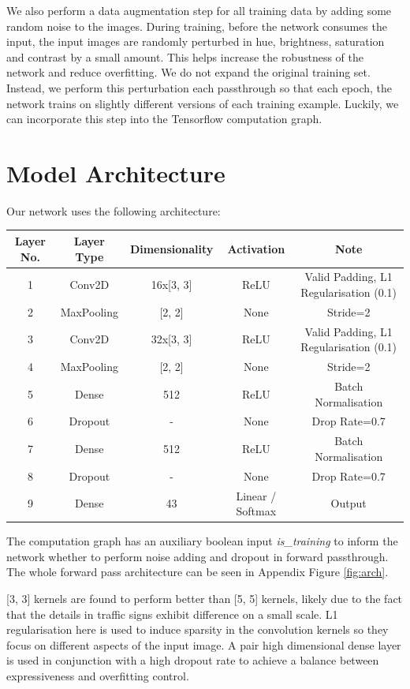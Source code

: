 \documentclass[]{article}
\begin{document}
We also perform a data augmentation step for all training data by adding some random noise to the images. During training, before the network consumes the input, the input images are randomly perturbed in hue, brightness, saturation and contrast by a small amount. This helps increase the robustness of the network and reduce overfitting. We do not expand the original training set. Instead, we perform this perturbation each passthrough so that each epoch, the network trains on slightly different versions of each training example. Luckily, we can incorporate this step into the Tensorflow computation graph.

\newpage
\section{Model Architecture}

Our network uses the following architecture:

\begin{center}
	\begin{tabular}{c | c | c | c | c}
		\hline
		Layer No. & Layer Type & Dimensionality & Activation & Note \\ \hline
		1 & Conv2D & 16x[3, 3] & ReLU & Valid Padding, L1 Regularisation (0.1) \\ \hline
		2 & MaxPooling & [2, 2] & None & Stride=2 \\ \hline
		3 & Conv2D & 32x[3, 3] & ReLU & Valid Padding, L1 Regularisation (0.1) \\ \hline
		4 & MaxPooling & [2, 2] & None & Stride=2 \\ \hline
		5 & Dense & 512 & ReLU & Batch Normalisation \\ \hline
		6 & Dropout & - & None & Drop Rate=0.7 \\ \hline
		7 & Dense & 512 & ReLU & Batch Normalisation \\ \hline
		8 & Dropout & - & None & Drop Rate=0.7 \\ \hline
		9 & Dense & 43 & Linear / Softmax & Output \\ \hline
	\end{tabular}
\end{center}

The computation graph has an auxiliary boolean input \textit{is\_training} to inform the network whether to perform noise adding and dropout in forward passthrough. The whole forward pass architecture can be seen in Appendix Figure \ref{fig:arch}.

[3, 3] kernels are found to perform better than [5, 5] kernels, likely due to the fact that the details in traffic signs exhibit difference on a small scale. L1 regularisation here is used to induce sparsity in the convolution kernels so they focus on different aspects of the input image. A pair high dimensional dense layer is used in conjunction with a high dropout rate to achieve a balance between expressiveness and overfitting control.
\end{document}
